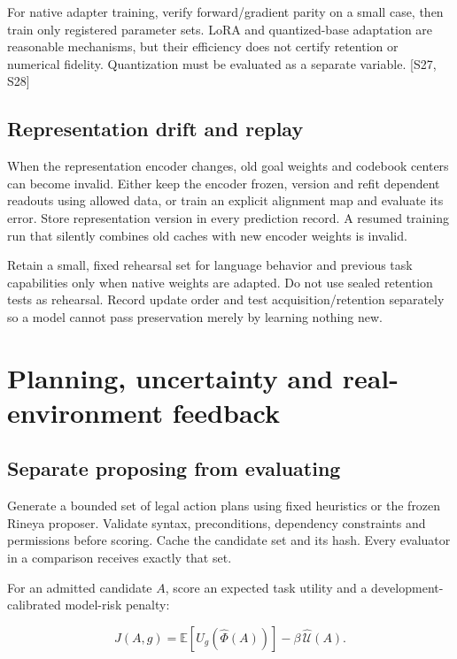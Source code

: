 \documentclass[
  11pt,
  a4paper,
]{article}
\begin{document}
For native adapter training, verify forward/gradient parity on a small
case, then train only registered parameter sets. LoRA and quantized-base
adaptation are reasonable mechanisms, but their efficiency does not
certify retention or numerical fidelity. Quantization must be evaluated
as a separate variable. {[}S27, S28{]}

\subsection{Representation drift and
replay}\label{representation-drift-and-replay}

When the representation encoder changes, old goal weights and codebook
centers can become invalid. Either keep the encoder frozen, version and
refit dependent readouts using allowed data, or train an explicit
alignment map and evaluate its error. Store representation version in
every prediction record. A resumed training run that silently combines
old caches with new encoder weights is invalid.

Retain a small, fixed rehearsal set for language behavior and previous
task capabilities only when native weights are adapted. Do not use
sealed retention tests as rehearsal. Record update order and test
acquisition/retention separately so a model cannot pass preservation
merely by learning nothing new.

\section{Planning, uncertainty and real-environment
feedback}\label{planning-uncertainty-and-real-environment-feedback}

\subsection{Separate proposing from
evaluating}\label{separate-proposing-from-evaluating}

Generate a bounded set of legal action plans using fixed heuristics or
the frozen Rineya proposer. Validate syntax, preconditions, dependency
constraints and permissions before scoring. Cache the candidate set and
its hash. Every evaluator in a comparison receives exactly that set.

For an admitted candidate \(A\), score an expected task utility and a
development-calibrated model-risk penalty:

\[
J(A,g)=\mathbb E[U_g(\widehat\Phi(A))]-\beta\,\widehat{\mathcal U}(A).
\]
\end{document}
